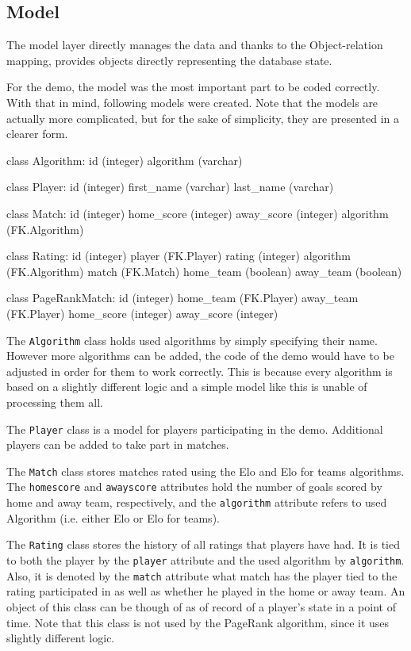 \subsection{Model}
The model layer directly manages the data and thanks to the Object-relation mapping, provides objects directly representing the database state.

For the demo, the model was the most important part to be coded correctly. With that in mind, following models were created. Note that the models are actually more complicated, but for the sake of simplicity, they are presented in a clearer form.

\begin{python}
class Algorithm:
	id (integer)
	algorithm (varchar)
	
class Player:
	id (integer)
	first_name (varchar)
	last_name (varchar)
	
class Match:
	id (integer)
	home_score (integer)
	away_score (integer)
	algorithm (FK.Algorithm)
	
class Rating:
	id (integer)
	player (FK.Player)
	rating (integer)
	algorithm (FK.Algorithm)
	match (FK.Match)
	home_team (boolean)
	away_team (boolean)
	
class PageRankMatch:
	id (integer)
	home_team (FK.Player)
	away_team (FK.Player)
	home_score (integer)
	away_score (integer)
\end{python}

The \texttt{Algorithm} class holds used algorithms by simply specifying their name. However more algorithms can be added, the code of the demo would have to be adjusted in order for them to work correctly. This is because every algorithm is based on a slightly different logic and a simple model like this is unable of processing them all.

The \texttt{Player} class is a model for players participating in the demo. Additional players can be added to take part in matches.

The \texttt{Match} class stores matches rated using the Elo and Elo for teams algorithms. The \texttt{home\textunderscore score} and \texttt{away\textunderscore score} attributes hold the number of goals scored by home and away team, respectively, and the \texttt{algorithm} attribute refers to used Algorithm (i.e. either Elo or Elo for teams).

The \texttt{Rating} class stores the history of all ratings that players have had. It is tied to both the player by the \texttt{player} attribute and the used algorithm by \texttt{algorithm}. Also, it is denoted by the \texttt{match} attribute what match has the player tied to the rating participated in as well as whether he played in the home or away team. An object of this class can be though of as of record of a player's state in a point of time. Note that this class is not used by the PageRank algorithm, since it uses slightly different logic.

